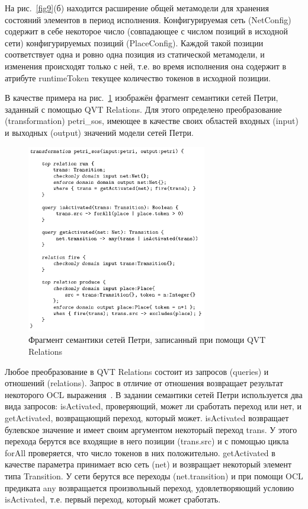 \documentclass[a5paper]{article}
\begin{document}
На рис.~\ref{fig9}(б) находится расширение общей метамодели для хранения состояний элементов в период исполнения. Конфигурируемая сеть (NetConfig) содержит в себе некоторое число (совпадающее с числом позиций в исходной сети) конфигурируемых позиций (PlaceConfig). Каждой такой позиции соответствует одна и ровно одна позиция из статической метамодели, и изменения происходят только с ней, т.е. во время исполнения она содержит в атрибуте runtimeToken текущее количество токенов в исходной позиции.

В качестве примера на рис.~\ref{fig10} изображён фрагмент семантики сетей Петри, заданный с помощью QVT Relations. Для этого определено преобразование (transformation) petri\_sos, имеющее в качестве своих областей входных (input) и выходных (output) значений модели сетей Петри.

\begin{figure} [ht]
  \begin{center}
    \includegraphics[width=0.7\textwidth]{eprovide-petrinet-qvt.png}
    \caption{Фрагмент семантики сетей Петри, записанный при помощи QVT Relations}
    \label{fig10}
  \end{center}
\end{figure}

Любое преобразование в QVT Relations состоит из запросов (queries) и отношений (relations). Запрос в отличие от отношения возвращает результат некоторого OCL выражения~\cite{ocl}. В задании семантики сетей Петри используется два вида запросов: isActivated, проверяющий, может ли сработать переход или нет, и getActivated, возвращающий переход, который может. isActivated возвращает булевское значение и имеет своим аргументом некоторый переход trans. У этого перехода берутся все входящие в него позиции (trans.src) и с помощью цикла forAll проверяется, что число токенов в них положительно. getActivated в качестве параметра принимает всю сеть (net) и возвращает некоторый элемент типа Transition. У сети берутся все переходы (net.transition) и при помощи OCL предиката any возвращается произвольный переход, удовлетворяющий условию isActivated, т.е. первый переход, который может сработать.
\end{document}
